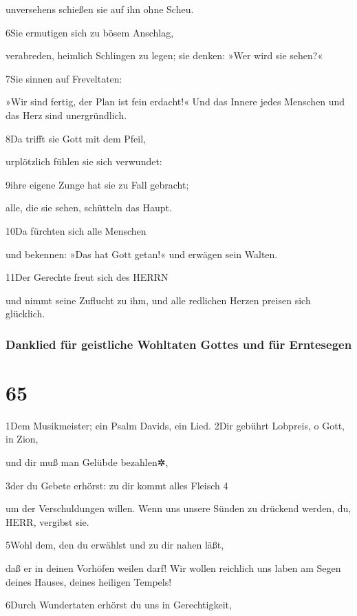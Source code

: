unversehens schießen sie auf ihn ohne Scheu.

6Sie ermutigen sich zu bösem Anschlag,

verabreden, heimlich Schlingen zu legen; sie denken: »Wer wird sie
sehen?«

7Sie sinnen auf Freveltaten:

»Wir sind fertig, der Plan ist fein erdacht!« Und das Innere jedes
Menschen und das Herz sind unergründlich.

8Da trifft sie Gott mit dem Pfeil,

urplötzlich fühlen sie sich verwundet:

9ihre eigene Zunge hat sie zu Fall gebracht;

alle, die sie sehen, schütteln das Haupt.

10Da fürchten sich alle Menschen

und bekennen: »Das hat Gott getan!« und erwägen sein Walten.

11Der Gerechte freut sich des HERRN

und nimmt seine Zuflucht zu ihm, und alle redlichen Herzen preisen sich
glücklich.

\hypertarget{danklied-fuxfcr-geistliche-wohltaten-gottes-und-fuxfcr-erntesegen}{%
\subsubsection{Danklied für geistliche Wohltaten Gottes und für
Erntesegen}\label{danklied-fuxfcr-geistliche-wohltaten-gottes-und-fuxfcr-erntesegen}}

\hypertarget{section-64}{%
\section{65}\label{section-64}}

1Dem Musikmeister; ein Psalm Davids, ein Lied. 2Dir gebührt Lobpreis, o
Gott, in Zion,

und dir muß man Gelübde bezahlen✲,

3der du Gebete erhörst: zu dir kommt alles Fleisch 4

um der Verschuldungen willen. Wenn uns unsere Sünden zu drückend werden,
du, HERR, vergibst sie.

5Wohl dem, den du erwählst und zu dir nahen läßt,

daß er in deinen Vorhöfen weilen darf! Wir wollen reichlich uns laben am
Segen deines Hauses, deines heiligen Tempels!

6Durch Wundertaten erhörst du uns in Gerechtigkeit,

